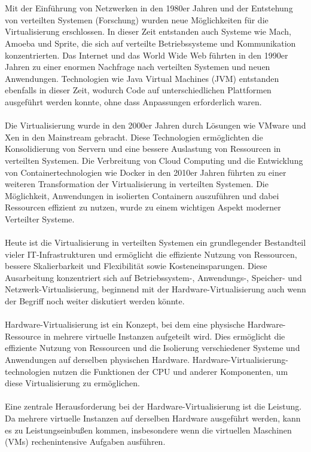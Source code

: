 \\\\
Mit der Einführung von Netzwerken in den 1980er Jahren und der Entstehung von verteilten Systemen (Forschung) wurden neue Möglichkeiten für die Virtualisierung erschlossen. In dieser Zeit entstanden auch Systeme wie Mach, Amoeba und Sprite, die sich auf verteilte Betriebssysteme und Kommunikation konzentrierten. Das Internet und das World Wide Web führten in den 1990er Jahren zu einer enormen Nachfrage nach verteilten Systemen und neuen Anwendungen. Technologien wie Java Virtual Machines (JVM) entstanden ebenfalls in dieser Zeit, wodurch Code auf unterschiedlichen Plattformen ausgeführt werden konnte, ohne dass Anpassungen erforderlich waren.
\\\\
Die Virtualisierung wurde in den 2000er Jahren durch Lösungen wie VMware und Xen in den Mainstream gebracht. Diese Technologien ermöglichten die Konsolidierung von Servern und eine bessere Auslastung von Ressourcen in verteilten Systemen. Die Verbreitung von Cloud Computing und die Entwicklung von Containertechnologien wie Docker in den 2010er Jahren führten zu einer weiteren Transformation der Virtualisierung in verteilten Systemen. Die Möglichkeit, Anwendungen in isolierten Containern auszuführen und dabei Ressourcen effizient zu nutzen, wurde zu einem wichtigen Aspekt moderner Verteilter Systeme.
\\\\
Heute ist die Virtualisierung in verteilten Systemen ein grundlegender Bestandteil vieler IT-Infrastrukturen und ermöglicht die effiziente Nutzung von Ressourcen, bessere Skalierbarkeit und Flexibilität sowie Kosteneinsparungen. Diese Ausarbeitung konzentriert sich auf Betriebssystem-, Anwendungs-, Speicher- und Netzwerk-Virtualisierung, beginnend mit der Hardware-Virtualisierung auch wenn der Begriff noch weiter diskutiert werden könnte. 
\\\\
Hardware-Virtualisierung ist ein Konzept, bei dem eine physische Hardware-Ressource in mehrere virtuelle Instanzen aufgeteilt wird. Dies ermöglicht die effiziente Nutzung von Ressourcen und die Isolierung verschiedener Systeme und Anwendungen auf derselben physischen Hardware. Hardware-Virtualisierung-technologien nutzen die Funktionen der CPU und anderer Komponenten, um diese Virtualisierung zu ermöglichen.
\\\\
Eine zentrale Herausforderung bei der Hardware-Virtualisierung ist die Leistung. Da mehrere virtuelle Instanzen auf derselben Hardware ausgeführt werden, kann es zu Leistungseinbußen kommen, insbesondere wenn die virtuellen Maschinen (VMs) rechenintensive Aufgaben ausführen.

